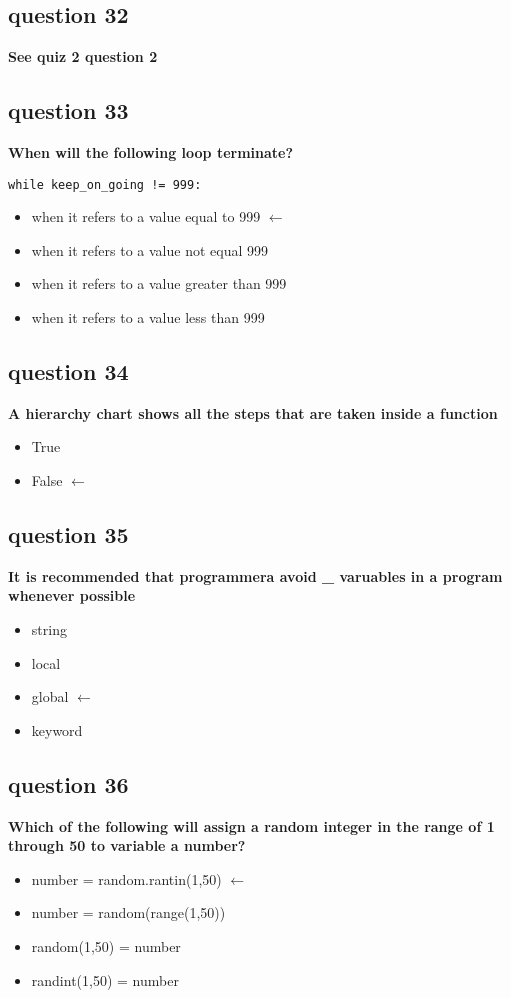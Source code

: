 \documentclass[10pt]{article}
\begin{document}
\subsection*{question 32}
\textbf{See quiz 2 question 2}
\subsection*{question 33}
\textbf{When will the following loop terminate?}
\begin{verbatim}
while keep_on_going != 999:
\end{verbatim}
\begin{itemize}
\item when it refers to a value equal to 999 $\leftarrow$   
\item when it refers to a value not equal 999
\item when it refers to a value greater than 999
\item when it refers to a value less than 999 
\end{itemize}
\subsection*{question 34}
\textbf{A hierarchy chart shows all the steps that are taken inside a function}
\begin{itemize}
\item True
\item False $\leftarrow$
\end{itemize}
\subsection*{question 35}
\textbf{It is recommended  that programmera avoid \_ varuables in a program whenever possible}
\begin{itemize}
\item string
\item local
\item global $\leftarrow$
\item keyword
\end{itemize}
\subsection*{question 36}
\textbf{Which of the following will assign a random integer in the range of 1 through 50 to variable a number?}
\begin{itemize}
\item number = random.rantin(1,50) $\leftarrow$
\item number = random(range(1,50)) 
\item random(1,50) = number
\item randint(1,50) = number
\end{itemize}
\end{document}
